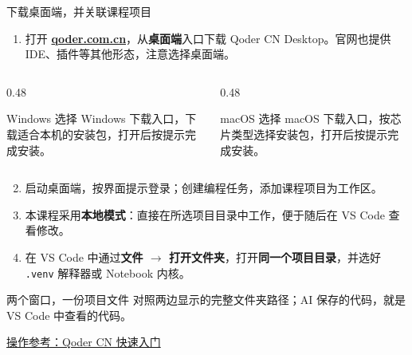 \documentclass[9pt]{ctexbeamer}
\begin{document}
\begin{frame}{下载桌面端，并关联课程项目}
  \begin{enumerate}
    \item 打开 \href{https://qoder.com.cn/}{\textbf{qoder.com.cn}}，从\textbf{桌面端}入口下载 Qoder CN Desktop。官网也提供 IDE、插件等其他形态，注意选择桌面端。
  \end{enumerate}
  \begin{columns}[T,totalwidth=\textwidth]
    \begin{column}{0.48\textwidth}
      \begin{block}{Windows}
        选择 Windows 下载入口，下载适合本机的安装包，打开后按提示完成安装。
      \end{block}
    \end{column}
    \begin{column}{0.48\textwidth}
      \begin{block}{macOS}
        选择 macOS 下载入口，按芯片类型选择安装包，打开后按提示完成安装。
      \end{block}
    \end{column}
  \end{columns}
  \begin{enumerate}
    \setcounter{enumi}{1}
    \item 启动桌面端，按界面提示登录；创建编程任务，添加课程项目为工作区。
    \item 本课程采用\textbf{本地模式}：直接在所选项目目录中工作，便于随后在 VS Code 查看修改。
    \item 在 VS Code 中通过\textbf{文件 $\rightarrow$ 打开文件夹}，打开\textbf{同一个项目目录}，并选好 \texttt{.venv} 解释器或 Notebook 内核。
  \end{enumerate}
  \begin{block}{两个窗口，一份项目文件}
    对照两边显示的完整文件夹路径；AI 保存的代码，就是 VS Code 中查看的代码。
  \end{block}
  {\tiny\href{https://docs.qoder.cn/qoder/quickstart}{操作参考：Qoder CN 快速入门}}
\end{frame}
\end{document}
